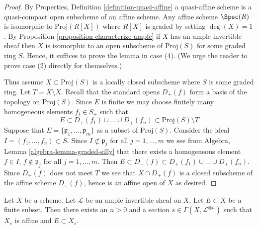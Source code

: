 \begin{proof}
By Properties, Definition \ref{definition-quasi-affine}
a quasi-affine scheme is a quasi-compact open subscheme
of an affine scheme. Any affine scheme $\Spec(R)$ is isomorphic to
$\text{Proj}(R[X])$ where $R[X]$ is graded by setting $\deg(X) = 1$.
By Proposition \ref{proposition-characterize-ample}
if $X$ has an ample invertible sheaf then $X$ is isomorphic to an open
subscheme of $\text{Proj}(S)$ for some graded ring $S$.
Hence, it suffices to prove the lemma in case (4).
(We urge the reader to prove case (2) directly for themselves.)

\medskip\noindent
Thus assume $X \subset \text{Proj}(S)$ is a locally closed subscheme
where $S$ is some graded ring. Let $T = \overline{X} \setminus X$.
Recall that the standard opens $D_{+}(f)$ form a basis of the
topology on $\text{Proj}(S)$. Since $E$ is finite we may choose finitely many
homogeneous elements $f_i \in S_{+}$ such that
$$
E \subset
D_{+}(f_1) \cup \ldots \cup D_{+}(f_n) \subset
\text{Proj}(S) \setminus T
$$
Suppose that $E = \{\mathfrak p_1, \ldots, \mathfrak p_m\}$
as a subset of $\text{Proj}(S)$.
Consider the ideal $I = (f_1, \ldots, f_n) \subset S$.
Since $I \not \subset \mathfrak p_j$ for all $j = 1, \ldots, m$
we see from Algebra, Lemma \ref{algebra-lemma-graded-silly} that
there exists a homogeneous element $f \in I$, $f \not \in \mathfrak p_j$
for all $j = 1, \ldots, m$. Then $E \subset D_{+}(f) \subset
D_{+}(f_1) \cup \ldots \cup D_{+}(f_n)$. Since $D_{+}(f)$ does not
meet $T$ we see that $X \cap D_{+}(f)$ is a closed subscheme of the
affine scheme $D_{+}(f)$, hence is an affine open of $X$ as desired.
\end{proof}

\begin{lemma}
\label{lemma-ample-finite-set-in-principal-affine}
Let $X$ be a scheme. Let $\mathcal{L}$ be an ample invertible sheaf on $X$.
Let $E \subset X$ be a finite subset. Then there exists an $n > 0$
and a section $s \in \Gamma(X, \mathcal{L}^{\otimes n})$ such that
$X_s$ is affine and $E \subset X_s$.
\end{lemma}

